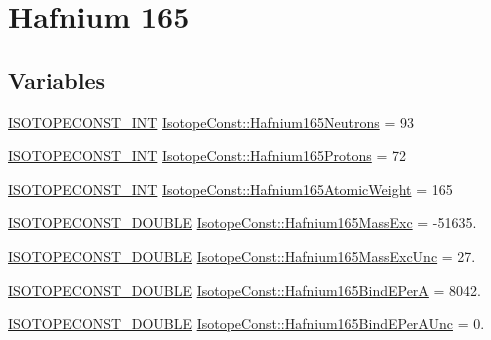 \hypertarget{group___isotope_const-_hafnium-_hf165}{}\section{Hafnium 165}
\label{group___isotope_const-_hafnium-_hf165}
\subsection*{Variables}
\begin{DoxyCompactItemize}
\item 
\mbox{\hyperlink{group___isotope_const-_macros_ga5f18360b3e99483a35c32d789e62621c}{I\+S\+O\+T\+O\+P\+E\+C\+O\+N\+S\+T\+\_\+\+I\+NT}} \mbox{\hyperlink{group___isotope_const-_hafnium-_hf165_gae18653797189e4168270d6a44782b2ee}{Isotope\+Const\+::\+Hafnium165\+Neutrons}} = 93
\item 
\mbox{\hyperlink{group___isotope_const-_macros_ga5f18360b3e99483a35c32d789e62621c}{I\+S\+O\+T\+O\+P\+E\+C\+O\+N\+S\+T\+\_\+\+I\+NT}} \mbox{\hyperlink{group___isotope_const-_hafnium-_hf165_gace3c059fed5818b41a1c76f8cc54d3c5}{Isotope\+Const\+::\+Hafnium165\+Protons}} = 72
\item 
\mbox{\hyperlink{group___isotope_const-_macros_ga5f18360b3e99483a35c32d789e62621c}{I\+S\+O\+T\+O\+P\+E\+C\+O\+N\+S\+T\+\_\+\+I\+NT}} \mbox{\hyperlink{group___isotope_const-_hafnium-_hf165_gac2417189709799b5366c1b394173728a}{Isotope\+Const\+::\+Hafnium165\+Atomic\+Weight}} = 165
\item 
\mbox{\hyperlink{group___isotope_const-_macros_ga8f45a7272ce02c0b4c65c44636ed719a}{I\+S\+O\+T\+O\+P\+E\+C\+O\+N\+S\+T\+\_\+\+D\+O\+U\+B\+LE}} \mbox{\hyperlink{group___isotope_const-_hafnium-_hf165_ga6eb77886ddc6c2ea49ba6f8a5b5abbe9}{Isotope\+Const\+::\+Hafnium165\+Mass\+Exc}} = -\/51635.
\item 
\mbox{\hyperlink{group___isotope_const-_macros_ga8f45a7272ce02c0b4c65c44636ed719a}{I\+S\+O\+T\+O\+P\+E\+C\+O\+N\+S\+T\+\_\+\+D\+O\+U\+B\+LE}} \mbox{\hyperlink{group___isotope_const-_hafnium-_hf165_gaf093eff82378364bb53a0016087347d7}{Isotope\+Const\+::\+Hafnium165\+Mass\+Exc\+Unc}} = 27.
\item 
\mbox{\hyperlink{group___isotope_const-_macros_ga8f45a7272ce02c0b4c65c44636ed719a}{I\+S\+O\+T\+O\+P\+E\+C\+O\+N\+S\+T\+\_\+\+D\+O\+U\+B\+LE}} \mbox{\hyperlink{group___isotope_const-_hafnium-_hf165_ga0588839e6ad6fea851aee05b6c5ecead}{Isotope\+Const\+::\+Hafnium165\+Bind\+E\+PerA}} = 8042.
\item 
\mbox{\hyperlink{group___isotope_const-_macros_ga8f45a7272ce02c0b4c65c44636ed719a}{I\+S\+O\+T\+O\+P\+E\+C\+O\+N\+S\+T\+\_\+\+D\+O\+U\+B\+LE}} \mbox{\hyperlink{group___isotope_const-_hafnium-_hf165_ga4db11ce8ada2e3aca6aef6168e3ab289}{Isotope\+Const\+::\+Hafnium165\+Bind\+E\+Per\+A\+Unc}} = 0.

\end{DoxyCompactItemize}
